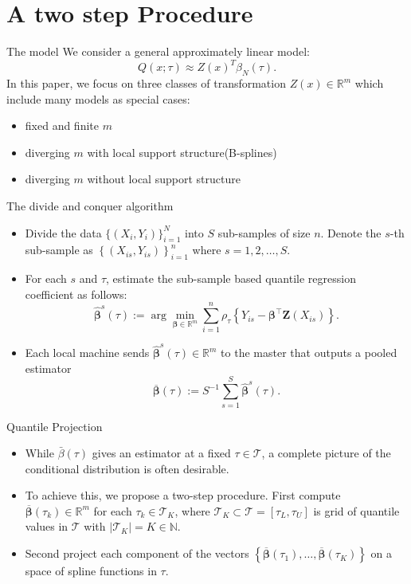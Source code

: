 \documentclass[11pt]{beamer}
\begin{document}
\section{A two step Procedure}
\begin{frame}{The model}
We consider a general approximately linear model:
$$
Q(x;\tau)\approx Z(x)^{T}\beta_{N}(\tau).
$$
In this paper, we focus on three classes of transformation $Z(x)\in \mathbb{R}^m$ which include many models as special cases:
\begin{itemize}
\item fixed and finite $m$
\item diverging $m$ with local support structure(B-splines)
\item diverging $m$ without local support structure
\end{itemize}
\end{frame}
\begin{frame}{The divide and conquer algorithm}
\begin{itemize}
\item Divide the data $\{(X_i,Y_i)\}_{i=1}^N$ into $S$ sub-samples of size $n$. Denote the $s$-th sub-sample as $\left\{\left(X_{i s}, Y_{i s}\right)\right\}_{i=1}^{n}$ where $s=1,2,\dots,S$.
\item For each $s$ and $\tau$, estimate the sub-sample based quantile regression coefficient as follows:
$$
\widehat{\boldsymbol{\beta}}^{s}(\tau):=\arg \min _{\boldsymbol{\beta} \in \mathbb{R}^{m}} \sum_{i=1}^{n} \rho_{\tau}\left\{Y_{i s}-\boldsymbol{\beta}^{\top} \mathbf{Z}\left(X_{i s}\right)\right\}.
$$
\item  Each local machine sends $\widehat{\boldsymbol{\beta}}^{s}(\tau) \in \mathbb{R}^{m}$ to the master that outputs a
pooled estimator
$$
\overline{\boldsymbol{\beta}}(\tau):=S^{-1} \sum_{s=1}^{S} \widehat{\boldsymbol{\beta}}^{s}(\tau).
$$
\end{itemize}
\end{frame}

\begin{frame}{Quantile Projection}
\begin{itemize}
\item While $\bar{\beta}(\tau)$ gives an estimator at a fixed $\tau\in \mathcal{T}$, a complete picture of the conditional distribution is often desirable.
\item To achieve this, we
propose a two-step procedure. First compute  $\overline{\boldsymbol{\beta}}\left(\tau_{k}\right) \in \mathbb{R}^{m}$ for each $\tau_{k} \in \mathcal{T}_{K}$, where $\mathcal{T}_{K} \subset \mathcal{T}=\left[\tau_{L}, \tau_{U}\right]$ is grid of quantile values in $\mathcal{T}$ with $|\mathcal{T}_K|=K\in \mathbb{N}$.
\item Second project each component of the vectors $\left\{\overline{\boldsymbol{\beta}}\left(\tau_{1}\right), \ldots, \overline{\boldsymbol{\beta}}\left(\tau_{K}\right)\right\}$  on a space
of spline functions in $\tau$. 
\end{itemize}
\end{frame}
\end{document}
